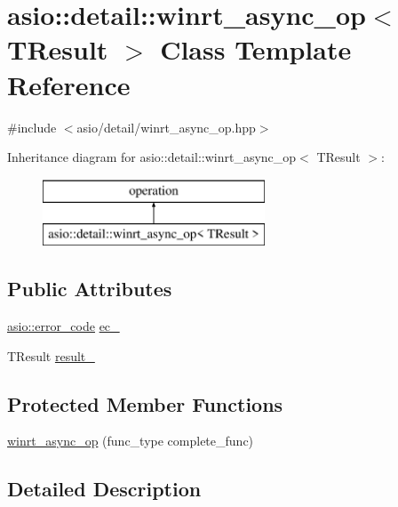 \hypertarget{classasio_1_1detail_1_1winrt__async__op}{}\section{asio\+:\+:detail\+:\+:winrt\+\_\+async\+\_\+op$<$ T\+Result $>$ Class Template Reference}
\label{classasio_1_1detail_1_1winrt__async__op}


{\ttfamily \#include $<$asio/detail/winrt\+\_\+async\+\_\+op.\+hpp$>$}

Inheritance diagram for asio\+:\+:detail\+:\+:winrt\+\_\+async\+\_\+op$<$ T\+Result $>$\+:\begin{figure}[H]
\begin{center}
\leavevmode
\includegraphics[height=2.000000cm]{classasio_1_1detail_1_1winrt__async__op}
\end{center}
\end{figure}
\subsection*{Public Attributes}
\begin{DoxyCompactItemize}
\item 
\hyperlink{classasio_1_1error__code}{asio\+::error\+\_\+code} \hyperlink{classasio_1_1detail_1_1winrt__async__op_a4b60f8bff9a9aa62182aca303d4e7ecd}{ec\+\_\+}
\item 
T\+Result \hyperlink{classasio_1_1detail_1_1winrt__async__op_a7a3a44d2ff57632838036a8c279a7a65}{result\+\_\+}
\end{DoxyCompactItemize}
\subsection*{Protected Member Functions}
\begin{DoxyCompactItemize}
\item 
\hyperlink{classasio_1_1detail_1_1winrt__async__op_a9892a30f4c7de5b5bf8a13c15d5aefda}{winrt\+\_\+async\+\_\+op} (func\+\_\+type complete\+\_\+func)
\end{DoxyCompactItemize}


\subsection{Detailed Description}
